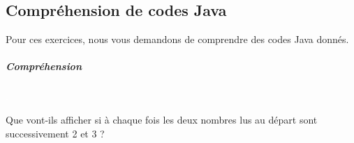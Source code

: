 \documentclass[11pt,a4paper]{article}
\begin{document}
            \par
        \subsection{Compr\'ehension de codes Java}
          Pour ces exercices, nous vous demandons de comprendre des codes Java donn\'es. 
          
			
		\subparagraph{Compr\'ehension} 
		
                \textcolor{white}{.} \par
            
							  Que vont-ils afficher si \`a chaque fois les deux nombres lus au d\'epart sont successivement 2 et 3 ?
							
					\begin{itemize}
				

\end{itemize}
\end{document}

